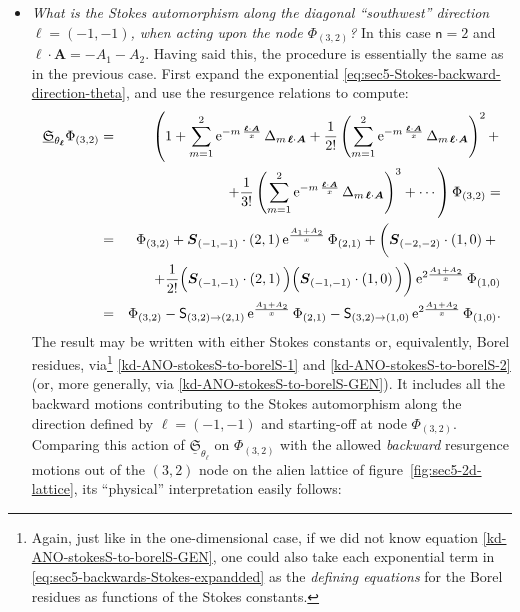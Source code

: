 \documentclass[11pt,a4paper]{article}
\newcommand{\rme}{{\mathrm{e}}}
\begin{document}
\begin{itemize}
%
\item \textit{What is the Stokes automorphism along the diagonal ``southwest'' direction $\boldsymbol{\ell}=(-1,-1)$, when acting upon the node $\Phi_{(3,2)}$?} In this case ${\textsf{n}}=2$ and $\boldsymbol{\ell} \cdot \boldsymbol{A} = - A_{1} - A_{2}$. Having said this, the procedure is essentially the same as in the previous case. First expand the exponential \eqref{eq:sec5-Stokes-backward-direction-theta}, and use the resurgence relations to compute:
%
\begin{eqnarray}
\underline{\mathfrak{S}}_{\theta_{\boldsymbol{\ell}}} \Phi_{(3,2)} &=& \left( 1 + \sum_{m=1}^{2} \rme^{-m\, \frac{\boldsymbol{\ell} \cdot \boldsymbol{A}}{x}}\, \Delta_{m\, \boldsymbol{\ell} \cdot \boldsymbol{A}} + \frac{1}{2!} \left( \sum_{m=1}^{2} \rme^{-m\, \frac{\boldsymbol{\ell} \cdot \boldsymbol{A}}{x}}\, \Delta_{m\, \boldsymbol{\ell} \cdot \boldsymbol{A}} \right)^2 + \right. \nonumber \\
&&
\left.
+ \frac{1}{3!} \left( \sum_{m=1}^{2} \rme^{-m\, \frac{\boldsymbol{\ell} \cdot \boldsymbol{A}}{x}}\, \Delta_{m\, \boldsymbol{\ell} \cdot \boldsymbol{A}} \right)^3 + \cdots \right) \Phi_{(3,2)} = \nonumber \\
&=& \Phi_{(3,2)} + \boldsymbol{S}_{(-1,-1)} \cdot \left(2,1\right) \rme^{\frac{A_{1}+A_{2}}{x}}\, \Phi_{\left(2,1\right)} + \left( \boldsymbol{S}_{(-2,-2)} \cdot \left(1,0\right) + \vphantom{\frac{1}{2!}} \right. \nonumber \\
&&
\label{eq:sec5-backwards-Stokes-expandded}
\left. + \frac{1}{2!} \Big( \boldsymbol{S}_{(-1,-1)} \cdot \left(2,1\right) \Big) \Big( \boldsymbol{S}_{(-1,-1)} \cdot \left(1,0\right) \Big) \right) \rme^{2\frac{A_{1}+A_{2}}{x}}\, \Phi_{\left(1,0\right)} \\
&=& \Phi_{(3,2)} - \mathsf{S}_{(3,2)\to(2,1)}\, \rme^{\frac{A_{1}+A_{2}}{x}}\, \Phi_{\left(2,1\right)} - \mathsf{S}_{(3,2)\to(1,0)}\, \rme^{2\frac{A_{1}+A_{2}}{x}}\, \Phi_{\left(1,0\right)}. \nonumber
\end{eqnarray}
%
\noindent
The result may be written with either Stokes constants or, equivalently, Borel residues, via\footnote{Again, just like in the one-dimensional case, if we did not know equation \eqref{kd-ANO-stokesS-to-borelS-GEN}, one could also take each exponential term in \eqref{eq:sec5-backwards-Stokes-expandded} as the \textit{defining equations} for the Borel residues as functions of the Stokes constants.} \eqref{kd-ANO-stokesS-to-borelS-1} and \eqref{kd-ANO-stokesS-to-borelS-2} (or, more generally, via \eqref{kd-ANO-stokesS-to-borelS-GEN}). It includes all the backward motions contributing to the Stokes automorphism along the direction defined by $\boldsymbol{\ell}=\left(-1,-1\right)$ and starting-off at node $\Phi_{(3,2)}$. Comparing this action of $\underline{\mathfrak{S}}_{\theta_{\boldsymbol{\ell}}}$ on $\Phi_{(3,2)}$ with the allowed \textit{backward} resurgence motions out of the $(3,2)$ node on the alien lattice of figure~\ref{fig:sec5-2d-lattice}, its ``physical'' interpretation easily follows:

\end{itemize}
\end{document}
